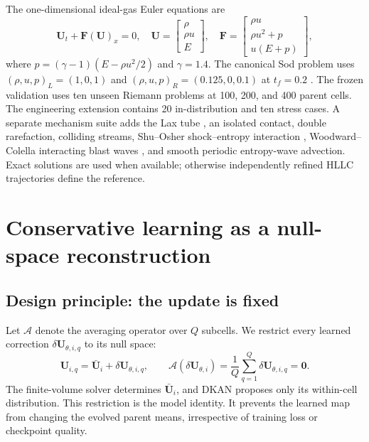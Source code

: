 \documentclass[10pt,twocolumn]{article}
\begin{document}
The one-dimensional ideal-gas Euler equations are
\begin{equation}
 \bm U_t+\bm F(\bm U)_x=0,
 \quad
 \bm U=
 \begin{bmatrix}\rho\\ \rho u\\ E\end{bmatrix},
 \quad
 \bm F=
 \begin{bmatrix}\rho u\\ \rho u^2+p\\ u(E+p)\end{bmatrix},
 \label{eq:euler}
\end{equation}
where $p=(\gamma-1)(E-\rho u^2/2)$ and $\gamma=1.4$. The canonical Sod problem uses $(\rho,u,p)_L=(1,0,1)$ and $(\rho,u,p)_R=(0.125,0,0.1)$ at $t_f=0.2$ \citep{sod1978survey}. The frozen validation uses ten unseen Riemann problems at 100, 200, and 400 parent cells. The engineering extension contains 20 in-distribution and ten stress cases. A separate mechanism suite adds the Lax tube \citep{lax1954weak}, an isolated contact, double rarefaction, colliding streams, Shu--Osher shock--entropy interaction \citep{shu1989eno2}, Woodward--Colella interacting blast waves \citep{woodward1984strongshocks}, and smooth periodic entropy-wave advection. Exact solutions are used when available; otherwise independently refined HLLC trajectories define the reference.

\section{Conservative learning as a null-space reconstruction}

\subsection{Design principle: the update is fixed}

Let $\mathcal A$ denote the averaging operator over $Q$ subcells. We restrict every learned correction $\delta\bm U_{\theta,i,q}$ to its null space:
\begin{equation}
 \bm U_{i,q}=\bar{\bm U}_i+\delta\bm U_{\theta,i,q},
 \qquad
 \mathcal A(\delta\bm U_{\theta,i})
 =\frac{1}{Q}\sum_{q=1}^{Q}\delta\bm U_{\theta,i,q}=\bm 0.
 \label{eq:nullspace}
\end{equation}
The finite-volume solver determines $\bar{\bm U}_i$, and DKAN proposes only its within-cell distribution. This restriction is the model identity. It prevents the learned map from changing the evolved parent means, irrespective of training loss or checkpoint quality.
\end{document}
